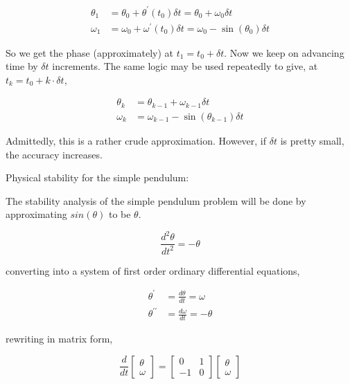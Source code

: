 \documentclass[a4paper,11pt]{report}
\begin{document}
\begin{enumerate}
    \begin{equation*}
    \begin{aligned}
    \theta_1 &= \theta_0 + \theta^{\prime}(t_0) \delta t = \theta_0 + \omega_0 \delta t \\
    \omega_1 &= \omega_0 + \omega^{\prime}(t_0) \delta t = \omega_0 - \sin(\theta_0) \delta t
    \end{aligned}
    \end{equation*}

    So we get the phase (approximately) at $t_1 = t_0 + \delta t$. Now we keep on
    advancing time by $\delta t$ increments. The same logic may be used repeatedly to 
    give, at $t_k = t_0 + k \cdot \delta t$,

    \begin{equation*}
    \begin{aligned}
    \theta_k &= \theta_{k-1} + \omega_{k-1} \delta t \\
    \omega_k &= \omega_{k-1} - \sin(\theta_{k-1}) \delta t
    \end{aligned}
    \end{equation*}

    Admittedly, this is a rather crude approximation. However, if $\delta t$ is pretty
    small, the accuracy increases.

    Physical stability for the simple pendulum:
    
    The stability analysis of the simple pendulum problem will be done by 
    approximating $sin(\theta)$ to be $\theta$.

    \begin{equation*}
    \frac{d^2 \theta}{dt^2} = - \theta
    \end{equation*}

    converting into a system of first order ordinary differential equations,

    \begin{equation*}
    \begin{aligned}
    \theta^{\prime} &= \frac{d \theta}{dt} = \omega \\
    \theta^{\prime\prime} &= \frac{d \omega}{dt} = - \theta
    \end{aligned}
    \end{equation*}

    rewriting in matrix form,
        
    \begin{equation*}
    \frac{d}{dt} \begin{bmatrix} \theta \\ \omega \end{bmatrix} = \begin{bmatrix} 0 & 1 \\ -1 & 0 \end{bmatrix} \begin{bmatrix} \theta \\ \omega \end{bmatrix}
    \end{equation*}


\end{enumerate}
\end{document}
